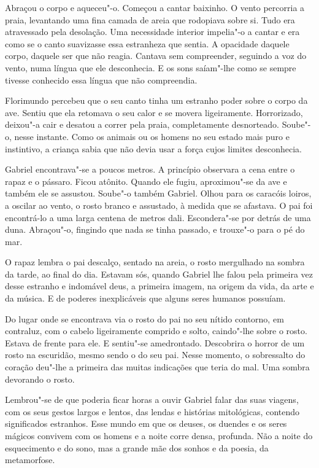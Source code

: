 Abraçou o corpo e aqueceu"-o. Começou a cantar baixinho. O vento
percorria a praia, levantando uma fina camada de areia que rodopiava
sobre si. Tudo era atravessado pela desolação. Uma necessidade interior
impelia"-o a cantar e era como se o canto suavizasse essa estranheza que
sentia. A opacidade daquele corpo, daquele ser que não reagia. Cantava
sem compreender, seguindo a voz do vento, numa língua que ele
desconhecia. E os sons saíam"-lhe como se sempre tivesse conhecido essa
língua que não compreendia.

Florimundo percebeu que o seu canto tinha um estranho poder sobre o
corpo da ave. Sentiu que ela retomava o seu calor e se movera
ligeiramente. Horrorizado, deixou"-a cair e desatou a correr pela praia,
completamente desnorteado. Soube"-o, nesse instante. Como os animais ou
os homens no seu estado mais puro e instintivo, a criança sabia que não
devia usar a força cujos limites desconhecia.

Gabriel encontrava"-se a poucos metros. A princípio observara a cena
entre o rapaz e o pássaro. Ficou atônito. Quando ele fugiu, aproximou"-se
da ave e também ele se assustou. Soube"-o também Gabriel. Olhou para os
caracóis loiros, a oscilar ao vento, o rosto branco e assustado, à
medida que se afastava. O pai foi encontrá-lo a uma larga centena de
metros dali. Escondera"-se por detrás de uma duna. Abraçou"-o, fingindo
que nada se tinha passado, e trouxe"-o para o pé do mar.

O rapaz lembra o pai descalço, sentado na areia, o rosto mergulhado na
sombra da tarde, ao final do dia. Estavam sós, quando Gabriel lhe falou
pela primeira vez desse estranho e indomável deus, a primeira imagem, na
origem da vida, da arte e da música. E de poderes inexplicáveis que
alguns seres humanos possuíam.

Do lugar onde se encontrava via o rosto do pai no seu nítido contorno,
em contraluz, com o cabelo ligeiramente comprido e solto, caindo"-lhe
sobre o rosto. Estava de frente para ele. E sentiu"-se amedrontado.
Descobrira o horror de um rosto na escuridão, mesmo sendo o do seu pai.
Nesse momento, o sobressalto do coração deu"-lhe a primeira das muitas
indicações que teria do mal. Uma sombra devorando o rosto.

Lembrou"-se de que poderia ficar horas a ouvir Gabriel falar das suas
viagens, com os seus gestos largos e lentos, das lendas e histórias
mitológicas, contendo significados estranhos. Esse mundo em que os
deuses, os duendes e os seres mágicos convivem com os homens e a noite
corre densa, profunda. Não a noite do esquecimento e do sono, mas a
grande mãe dos sonhos e da poesia, da metamorfose.

